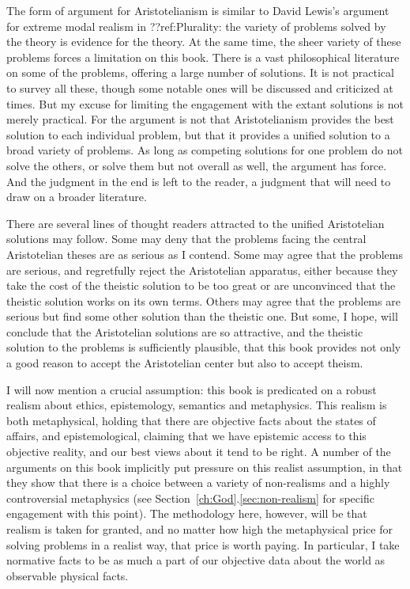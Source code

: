 The form of argument for Aristotelianism is similar to David Lewis's argument for extreme modal realism 
in ??ref:Plurality: the variety of problems solved by the theory is evidence for the theory.
At the same time, the sheer variety of these problems forces a limitation on this book. There is a vast 
philosophical literature on some of the problems, offering a large number of solutions. It is not practical
to survey all these, though some notable ones will be discussed and criticized at times. But my excuse for 
limiting the engagement with the extant solutions is not merely practical. For the argument is not that 
Aristotelianism provides the best solution to each individual problem, but that it provides a unified solution
to a broad variety of problems. As long as competing solutions for one problem do not solve the others,
or solve them but not overall as well, the argument has force. And the judgment in the end is left to 
the reader, a judgment that will need to draw on a broader literature.

There are several lines of thought readers attracted to the unified Aristotelian solutions may  follow. Some
may deny that the problems facing the central Aristotelian theses are as serious as I contend. Some may agree that
the problems are serious, and regretfully reject the Aristotelian apparatus, either because they take the cost of 
the theistic solution to be too great or are unconvinced that the theistic solution works on its own terms. 
Others may agree that the problems are serious but find some other solution than the theistic one. But some, I hope, 
will conclude that the Aristotelian solutions are so attractive, and the theistic solution to the problems is sufficiently 
plausible, that this book provides not only a good reason to accept the Aristotelian center but also to accept
theism.

I will now mention a crucial assumption: this book is predicated on a robust realism about ethics, epistemology, semantics and 
metaphysics. This realism is both metaphysical, holding that there are objective facts about the states of affairs, and 
epistemological, claiming that we have epistemic access to this objective reality, and our best views about it tend to be 
right.  A number of the arguments on this book implicitly put pressure on this realist assumption, in that they show that 
there is a choice between a variety of non-realisms and a highly controversial metaphysics (see 
Section~\ref{ch:God}.\ref{sec:non-realism}
for specific engagement with this point). The methodology here, however, 
will be that realism is taken for granted, and no matter how high the metaphysical price for solving problems in a realist
way, that price is worth paying. In particular, I take normative facts to be as much a part of our objective data about 
the world as observable physical facts. 

